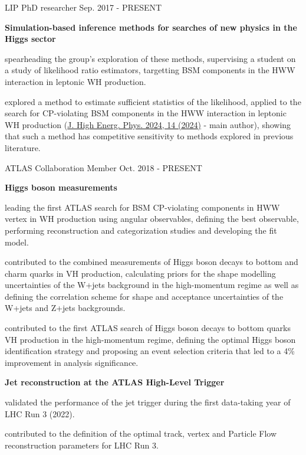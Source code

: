 
\begin{cventries}

    \cventry
    {LIP}
    {PhD researcher}
    {}
    {Sep. 2017 - PRESENT}
    {
        \textbf{Simulation-based inference methods for searches of new physics in the Higgs sector}\vspace{12pt}
        \begin{cvitems}      
            \item {spearheading the group's exploration of these methods, supervising a student on a study of likelihood ratio estimators, targetting BSM components in the HWW interaction in leptonic WH production.}
            \item {explored a method to estimate sufficient statistics of the likelihood, applied to the search for CP-violating BSM components in the HWW interaction in leptonic WH production (\href{https://doi.org/10.1007/JHEP04(2024)014}{J. High Energ. Phys. 2024, 14 (2024)} - main author), showing that such a method has competitive sensitivity to methods explored in previous literature.}
        \end{cvitems}
    }

    \cventry
    {ATLAS Collaboration}
    {Member}
    {}
    {Oct. 2018 - PRESENT}
    {
        \textbf{Higgs boson measurements}\vspace{14pt}
        \begin{cvitems}
            \item {leading the first ATLAS search for BSM CP-violating components in HWW vertex in WH production using angular observables, defining the best observable, performing reconstruction and categorization studies and developing the fit model.}
            \item {contributed to the combined measurements of Higgs boson decays to bottom and charm quarks in VH production, calculating priors for the shape modelling uncertainties of the W+jets background in the high-momentum regime as well as defining the correlation scheme for shape and acceptance uncertainties of the W+jets and Z+jets backgrounds.}
            \item {contributed to the first ATLAS search of Higgs boson decays to bottom quarks VH production in the high-momentum regime, defining the optimal Higgs boson identification strategy and proposing an event selection criteria that led to a 4\% improvement in analysis significance.}
        \end{cvitems}\vspace{19pt}
        \textbf{Jet reconstruction at the ATLAS High-Level Trigger}\vspace{14pt}
        \begin{cvitems}
            \item {validated the performance of the jet trigger during the first data-taking year of LHC Run 3 (2022).}
            \item {contributed to the definition of the optimal track, vertex and Particle Flow reconstruction parameters for LHC Run 3.}
        \end{cvitems}
    }


\end{cventries}
